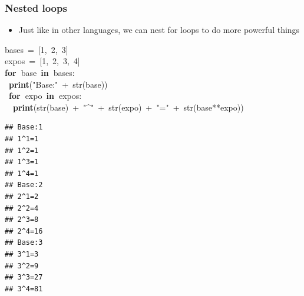 \documentclass{beamer}\usepackage[]{graphicx}\usepackage[]{color}
\makeatletter
\newcommand{\hlnum}[1]{\textcolor[rgb]{0.686,0.059,0.569}{#1}}%
\newcommand{\hlstr}[1]{\textcolor[rgb]{0.192,0.494,0.8}{#1}}%
\newcommand{\hlopt}[1]{\textcolor[rgb]{0,0,0}{#1}}%
\newcommand{\hlstd}[1]{\textcolor[rgb]{0.345,0.345,0.345}{#1}}%
\newcommand{\hlkwa}[1]{\textcolor[rgb]{0.161,0.373,0.58}{\textbf{#1}}}%
\newcommand{\hlkwb}[1]{\textcolor[rgb]{0.69,0.353,0.396}{#1}}%
\newenvironment{kframe}{%
 \def\at@end@of@kframe{}%
 \ifinner\ifhmode%
  \def\at@end@of@kframe{\end{minipage}}%
  \begin{minipage}{\columnwidth}%
 \fi\fi%
 \def\FrameCommand##1{\hskip\@totalleftmargin \hskip-\fboxsep
 \colorbox{shadecolor}{##1}\hskip-\fboxsep
     \hskip-\linewidth \hskip-\@totalleftmargin \hskip\columnwidth}%
 \MakeFramed {\advance\hsize-\width
   \@totalleftmargin\z@ \linewidth\hsize
   \@setminipage}}%
 {\par\unskip\endMakeFramed%
 \at@end@of@kframe}
\newenvironment{knitrout}{}{} %
\makeatother
\begin{document}
\begin{frame}[fragile]
\frametitle{Nested loops}
\begin{itemize}
	\item Just like in other languages, we can nest for loops to do more powerful things
\end{itemize}
\begin{knitrout}\tiny
{}\color{fgcolor}\begin{kframe}
\noindent
\ttfamily
\hlstd{bases\ }\hlopt{=\ {[}}\hlstd{}\hlnum{1}\hlstd{}\hlopt{,\ }\hlstd{}\hlnum{2}\hlstd{}\hlopt{,\ }\hlstd{}\hlnum{3}\hlstd{}\hlopt{{]}}\hspace*{\fill}\\
\hlstd{expos\ }\hlopt{=\ {[}}\hlstd{}\hlnum{1}\hlstd{}\hlopt{,\ }\hlstd{}\hlnum{2}\hlstd{}\hlopt{,\ }\hlstd{}\hlnum{3}\hlstd{}\hlopt{,\ }\hlstd{}\hlnum{4}\hlstd{}\hlopt{{]}}\hspace*{\fill}\\
\hlstd{}\hlkwa{for\ }\hlstd{base\ }\hlkwa{in\ }\hlstd{bases}\hlopt{:}\hspace*{\fill}\\
\hlstd{\ }\hlkwa{print}\hlstd{}\hlopt{(}\hlstd{}\hlstr{"Base:"}\hlstd{\ }\hlopt{+\ }\hlstd{}\hlkwb{str}\hlstd{}\hlopt{(}\hlstd{base}\hlopt{))}\hspace*{\fill}\\
\hlstd{\ }\hlkwa{for\ }\hlstd{expo\ }\hlkwa{in\ }\hlstd{expos}\hlopt{:}\hspace*{\fill}\\
\hlstd{}\hlstd{\ \ }\hlstd{}\hlkwa{print}\hlstd{}\hlopt{(}\hlstd{}\hlkwb{str}\hlstd{}\hlopt{(}\hlstd{base}\hlopt{)\ +\ }\hlstd{}\hlstr{"\textasciicircum "}\hlstd{\ }\hlopt{+\ }\hlstd{}\hlkwb{str}\hlstd{}\hlopt{(}\hlstd{expo}\hlopt{)\ +\ }\hlstd{}\hlstr{"="}\hlstd{\ }\hlopt{+\ }\hlstd{}\hlkwb{str}\hlstd{}\hlopt{(}\hlstd{base}\hlopt{{*}{*}}\hlstd{expo}\hlopt{))}\hlstd{}\hspace*{\fill}
\mbox{}
\normalfont

\begin{verbatim}
## Base:1
## 1^1=1
## 1^2=1
## 1^3=1
## 1^4=1
## Base:2
## 2^1=2
## 2^2=4
## 2^3=8
## 2^4=16
## Base:3
## 3^1=3
## 3^2=9
## 3^3=27
## 3^4=81
\end{verbatim}
\end{kframe}
\end{knitrout}
\end{frame}
\end{document}
